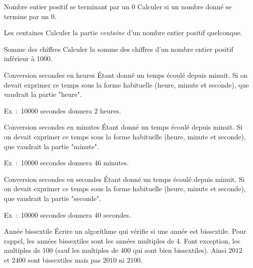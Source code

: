 			\begin{Exercice}{Nombre entier positif se terminant par un 0}
				Calculer si un nombre donné se termine par un 0.
			\end{Exercice}
	
			\begin{Exercice}{Les centaines}
				Calculer la partie \emph{centaine}
				d'un nombre entier positif quelconque.
			\end{Exercice}
	
			\begin{Exercice}{Somme des chiffres}
				Calculer la somme des chiffres
				d’un nombre entier positif inférieur à 1000.
			\end{Exercice}
		
			\begin{Exercice}{Conversion secondes en heures}
				Étant donné un temps écoulé depuis minuit.
				Si on devait exprimer ce temps sous la forme
				habituelle (heure, minute et seconde),
				que vaudrait la partie "heure".
		
				Ex~:~10000 secondes donnera 2 heures.
			\end{Exercice}
		
			\begin{Exercice}{Conversion secondes en minutes}
				Étant donné un temps écoulé depuis minuit.
				Si on devait exprimer ce temps sous la forme
				habituelle (heure, minute et seconde),
				que vaudrait la partie "minute".
		
				Ex~:~10000 secondes donnera 46 minutes.
			\end{Exercice}
		
			\begin{Exercice}{Conversion secondes en secondes}
				Étant donné un temps écoulé depuis minuit.
				Si on devait exprimer ce temps sous la forme
				habituelle (heure, minute et seconde),
				que vaudrait la partie "seconde".
		
				Ex~:~10000 secondes donnera 40 secondes.
			\end{Exercice}	
		
			\begin{Exercice}{Année bissextile}
				Écrire un algorithme qui vérifie si une année est bissextile. 
				Pour rappel, les années bissextiles sont les années multiples de 4. 
				Font exception, les multiples de 100 
				(sauf les multiples de 400 qui sont bien bissextiles). 
				Ainsi $2012$ et $2400$ sont bissextiles mais pas $2010$ ni $2100$.
			\end{Exercice}

